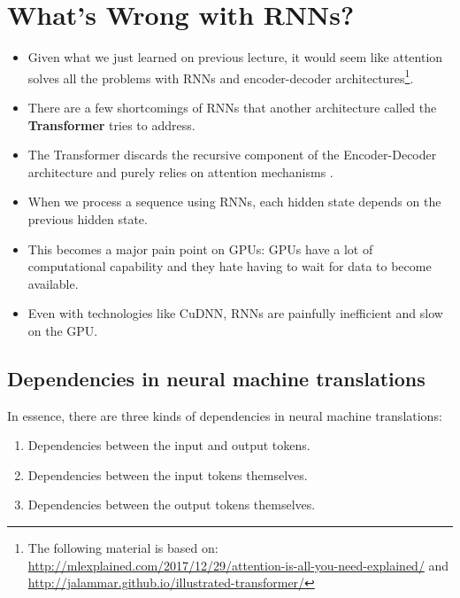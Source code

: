 \section{What's Wrong with RNNs?}
\begin{itemize}
\item Given what we just learned on previous lecture, it would seem like attention solves all the problems with RNNs and encoder-decoder architectures\footnote{The following material is based on: \url{http://mlexplained.com/2017/12/29/attention-is-all-you-need-explained/} and \url{http://jalammar.github.io/illustrated-transformer/}}.

\item There are a few shortcomings of RNNs that another architecture called the \textbf{Transformer} tries to address.

\item The Transformer discards the recursive component of the Encoder-Decoder architecture and purely relies on attention mechanisms \cite{vaswani2017attention}.

\item When we process a sequence using RNNs, each hidden state depends on the previous hidden state. 

\item This becomes a major pain point on GPUs: GPUs have a lot of computational capability and they hate having to wait for data to become available.

\item Even with technologies like CuDNN, RNNs are painfully inefficient and slow on the GPU.


\end{itemize}

\subsection{Dependencies in neural machine translations}
In essence, there are three kinds of dependencies in neural machine translations: 
\begin{enumerate}
\item Dependencies between the input and output tokens.

\item Dependencies between the input tokens themselves.

\item Dependencies between the output tokens themselves.
\end{enumerate}


